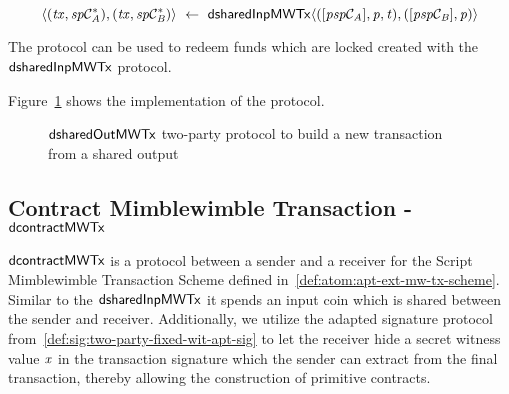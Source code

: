 \[ \langle (\mathit{tx}, \mathit{sp}\mathcal{C}_{\mathit{A}}^*), (\mathit{tx}, \mathit{sp}\mathcal{C}_{\mathit{B}}^*) \rangle ~\leftarrow~ \mathsf{dsharedInpMWTx} \langle([\mathit{psp}\mathcal{C}_{\mathit{A}}],\mathit{p},\mathit{t}), ([\mathit{psp}\mathcal{C}_{\mathit{B}}],\mathit{p}) \rangle \]

The protocol can be used to redeem funds which are locked created with the $\mathsf{dsharedInpMWTx}$ protocol.

Figure~\ref{fig:d-shared-inp-mw-tx} shows the implementation of the protocol.

\begin{figure}
    \caption{$\mathsf{dsharedOutMWTx}$ two-party protocol to build a new transaction from a shared output} \label{fig:d-shared-inp-mw-tx}
\end{figure}

\subsection{Contract Mimblewimble Transaction - $\mathsf{dcontractMWTx}$} \label{subsec:atom:script-mw-tx}

$\mathsf{dcontractMWTx}$ is a protocol between a sender and a receiver for the Script Mimblewimble Transaction Scheme defined in~\ref{def:atom:apt-ext-mw-tx-scheme}.
Similar to the $\mathsf{dsharedInpMWTx}$ it spends an input coin which is shared between the sender and receiver.
Additionally, we utilize the adapted signature protocol from~\ref{def:sig:two-party-fixed-wit-apt-sig} to let the receiver hide a secret witness value $\mathit{x}$ in the transaction signature which the sender can extract from the final transaction, thereby allowing the construction of primitive contracts.

